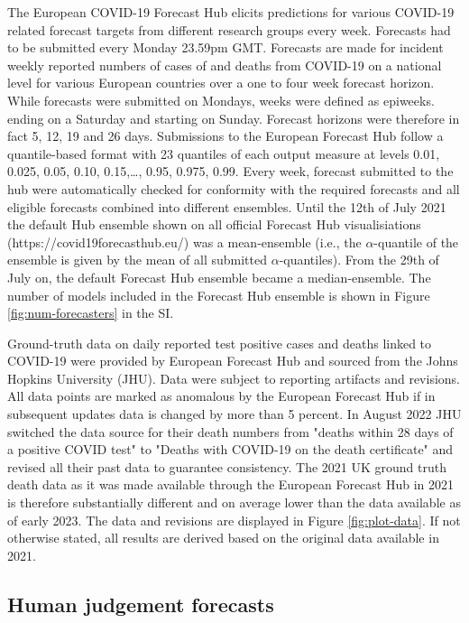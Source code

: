 \documentclass[10pt,a4paper,twocolumn]{article}
\begin{document}
The European COVID-19 Forecast Hub \cite{sherrattPredictivePerformanceMultimodel2022a} elicits predictions for various COVID-19 related forecast targets from different research groups every week. Forecasts had to be submitted every Monday 23.59pm GMT. Forecasts are made for incident weekly reported numbers of cases of and deaths from COVID-19 on a national level for various European countries over a one to four week forecast horizon. While forecasts were submitted on Mondays, weeks were defined as epiweeks. ending on a Saturday and starting on Sunday. Forecast horizons were therefore in fact 5, 12, 19 and 26 days. Submissions to the European Forecast Hub follow a quantile-based format with 23 quantiles of each output measure at levels 0.01, 0.025, 0.05, 0.10, 0.15,…, 0.95, 0.975, 0.99.
Every week, forecast submitted to the hub were automatically checked for conformity with the required forecasts and all eligible forecasts combined into different ensembles. Until the 12th of July 2021 the default Hub ensemble shown on all official Forecast Hub visualisiations (https://covid19forecasthub.eu/) was a mean-ensemble (i.e., the $\alpha$-quantile of the ensemble is given by the mean of all submitted $\alpha$-quantiles). From the 29th of July on, the default Forecast Hub ensemble became a median-ensemble. The number of models included in the Forecast Hub ensemble is shown in Figure \ref{fig:num-forecasters} in the SI. 

Ground-truth data on daily reported test positive cases and deaths linked to COVID-19 were provided by European Forecast Hub and sourced from the Johns Hopkins University (JHU). Data were subject to reporting artifacts and revisions. All data points are marked as anomalous by the European Forecast Hub if in subsequent updates data is changed by more than 5 percent. In August 2022 JHU switched the data source for their death numbers from "deaths within 28 days of a positive COVID test" to "Deaths with COVID-19 on the death certificate" and revised all their past data to guarantee consistency. The 2021 UK ground truth death data as it was made available through the European Forecast Hub in 2021 is therefore substantially different and on average lower than the data available as of early 2023. The data and revisions are displayed in Figure \ref{fig:plot-data}. If not otherwise stated, all results are derived based on the original data available in 2021. 

\subsection*{Human judgement forecasts}
\end{document}
